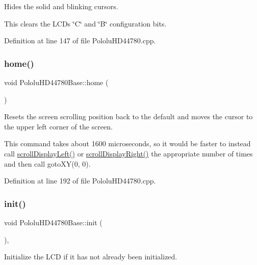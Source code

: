 Hides the solid and blinking cursors.

This clears the L\+CD\textquotesingle{}s \char`\"{}\+C\char`\"{} and \char`\"{}\+B\char`\"{} configuration bits. 

Definition at line 147 of file Pololu\+H\+D44780.\+cpp.

\mbox{\label{class_pololu_h_d44780_base_ab2d24add3c6da0328055bceb38a6d42c}} 
\subsubsection{\texorpdfstring{home()}{home()}}
{\footnotesize\ttfamily void Pololu\+H\+D44780\+Base\+::home (\begin{DoxyParamCaption}{ }\end{DoxyParamCaption})\hspace{0.3cm}{\ttfamily [inherited]}}

Resets the screen scrolling position back to the default and moves the cursor to the upper left corner of the screen.

This command takes about 1600 microseconds, so it would be faster to instead call \hyperlink{class_pololu_h_d44780_base_aada34a47663585f60b70e1d6f936f6d3}{scroll\+Display\+Left()} or \hyperlink{class_pololu_h_d44780_base_a411512707f303af75de3c5aea313bf48}{scroll\+Display\+Right()} the appropriate number of times and then call goto\+X\+Y(0, 0). 

Definition at line 192 of file Pololu\+H\+D44780.\+cpp.

\mbox{\label{class_pololu_h_d44780_base_a1c2a3edc8cfecde7e6fd2a83c17c0e23}} 
\subsubsection{\texorpdfstring{init()}{init()}}
{\footnotesize\ttfamily void Pololu\+H\+D44780\+Base\+::init (\begin{DoxyParamCaption}{ }\end{DoxyParamCaption})\hspace{0.3cm}{\ttfamily [inline]}, {\ttfamily [inherited]}}

Initialize the L\+CD if it has not already been initialized. 

